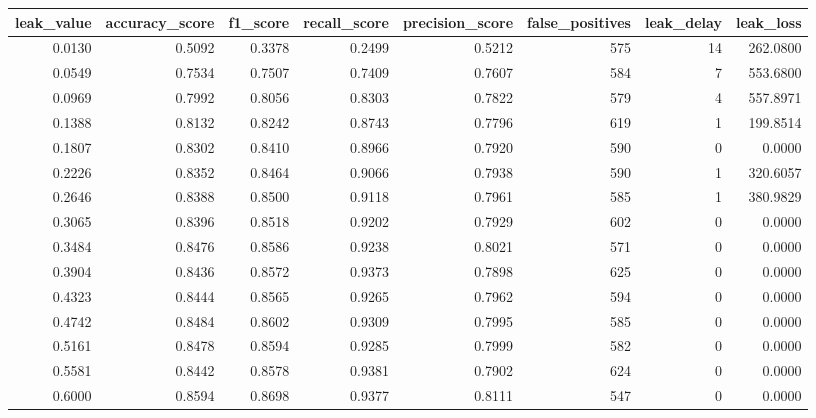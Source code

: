 \begin{tabular}{rrrrrrrr}
\toprule
leak\_value & accuracy\_score & f1\_score & recall\_score & precision\_score & false\_positives & leak\_delay & leak\_loss \\
\midrule
0.0130 & 0.5092 & 0.3378 & 0.2499 & 0.5212 & 575 & 14 & 262.0800 \\
0.0549 & 0.7534 & 0.7507 & 0.7409 & 0.7607 & 584 & 7 & 553.6800 \\
0.0969 & 0.7992 & 0.8056 & 0.8303 & 0.7822 & 579 & 4 & 557.8971 \\
0.1388 & 0.8132 & 0.8242 & 0.8743 & 0.7796 & 619 & 1 & 199.8514 \\
0.1807 & 0.8302 & 0.8410 & 0.8966 & 0.7920 & 590 & 0 & 0.0000 \\
0.2226 & 0.8352 & 0.8464 & 0.9066 & 0.7938 & 590 & 1 & 320.6057 \\
0.2646 & 0.8388 & 0.8500 & 0.9118 & 0.7961 & 585 & 1 & 380.9829 \\
0.3065 & 0.8396 & 0.8518 & 0.9202 & 0.7929 & 602 & 0 & 0.0000 \\
0.3484 & 0.8476 & 0.8586 & 0.9238 & 0.8021 & 571 & 0 & 0.0000 \\
0.3904 & 0.8436 & 0.8572 & 0.9373 & 0.7898 & 625 & 0 & 0.0000 \\
0.4323 & 0.8444 & 0.8565 & 0.9265 & 0.7962 & 594 & 0 & 0.0000 \\
0.4742 & 0.8484 & 0.8602 & 0.9309 & 0.7995 & 585 & 0 & 0.0000 \\
0.5161 & 0.8478 & 0.8594 & 0.9285 & 0.7999 & 582 & 0 & 0.0000 \\
0.5581 & 0.8442 & 0.8578 & 0.9381 & 0.7902 & 624 & 0 & 0.0000 \\
0.6000 & 0.8594 & 0.8698 & 0.9377 & 0.8111 & 547 & 0 & 0.0000 \\
\bottomrule
\end{tabular}
